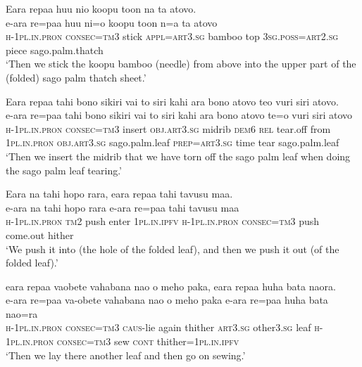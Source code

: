 \ea\label{ex:text12-26}
Eara repaa huu nio koopu toon na ta atovo.\\
\gll e-ara	re=paa	huu	ni=o	koopu	toon	n=a	ta	atovo\\
     \textsc{h}-1\textsc{pl}.\textsc{in}.\textsc{pron}	\textsc{consec}=\textsc{tm}3	stick	\textsc{appl}=\textsc{art}3.\textsc{sg}	bamboo	top	3\textsc{sg}.\textsc{poss}=\textsc{art}2.\textsc{sg}	piece	sago.palm.thatch\\
\glt `Then we stick the koopu bamboo (needle) from above into the upper part of the (folded) sago palm thatch sheet.'
\z

\ea\label{ex:text12-27}
Eara repaa tahi bono sikiri vai to siri kahi ara bono atovo teo vuri siri atovo.\\
\gll e-ara	re=paa	tahi	bono	sikiri	vai	to	siri	kahi	ara	bono	atovo	te=o	vuri	siri	atovo\\
     \textsc{h}-1\textsc{pl}.\textsc{in}.\textsc{pron}	\textsc{consec}=\textsc{tm}3	insert	\textsc{obj}.\textsc{art}3.\textsc{sg}	midrib	\textsc{dem}6	\textsc{rel}	tear.off	from	1\textsc{pl}.\textsc{in}.\textsc{pron}	\textsc{obj}.\textsc{art}3.\textsc{sg}	sago.palm.leaf	\textsc{prep}=\textsc{art}3.\textsc{sg}	time	tear	sago.palm.leaf\\
\glt `Then we insert the midrib that we have torn off the sago palm leaf when doing the sago palm leaf tearing.'
\z

\ea\label{ex:text12-28}
Eara na tahi hopo rara, eara repaa tahi tavusu maa.\\
\gll e-ara	na	tahi	hopo	rara	e-ara	re=paa	tahi	tavusu	maa\\
     \textsc{h}-1\textsc{pl}.\textsc{in}.\textsc{pron}	\textsc{tm}2	push	enter	1\textsc{pl}.\textsc{in}.\textsc{ipfv}	\textsc{h}-1\textsc{pl}.\textsc{in}.\textsc{pron}	\textsc{consec}=\textsc{tm}3	push	come.out	hither\\
\glt `We push it into (the hole of the folded leaf), and then we push it out (of the folded leaf).'
\z

\ea\label{ex:text12-29}
eara repaa vaobete vahabana nao o meho paka, eara repaa huha bata naora.\\
\gll e-ara	re=paa	va-obete	vahabana	nao	o	meho	paka	e-ara	re=paa	huha	bata	nao=ra\\
     \textsc{h}-1\textsc{pl}.\textsc{in}.\textsc{pron}	\textsc{consec}=\textsc{tm}3	\textsc{caus}-lie	again	thither	\textsc{art}3.\textsc{sg}	other3.\textsc{sg}	leaf	\textsc{h}-1\textsc{pl}.\textsc{in}.\textsc{pron}	\textsc{consec}=\textsc{tm}3	sew	\textsc{cont}	thither=1\textsc{pl}.\textsc{in}.\textsc{ipfv}\\
\glt `Then we lay there another leaf and then go on sewing.'
\z

